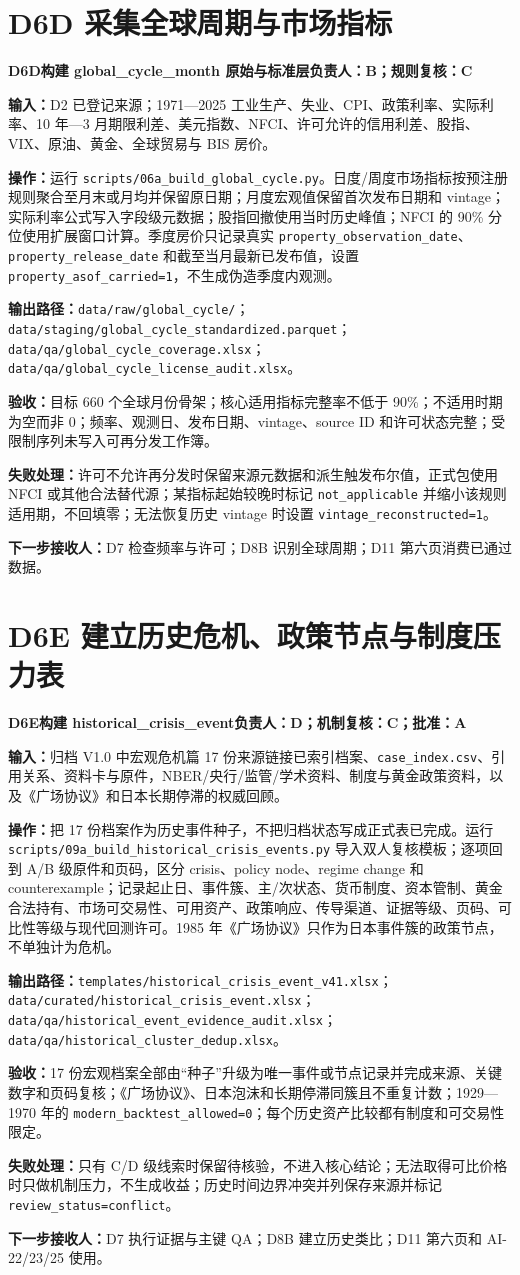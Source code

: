 \documentclass[UTF8,fontset=windows,12pt,openany]{ctexbook}
\newcommand{\Field}[1]{{\small\nolinkurl{#1}}}
\newcommand{\File}[1]{{\small\begingroup\urlstyle{same}\nolinkurl{#1}\endgroup}}
\newcommand{\StepTitle}[3]{%
  \noindent\colorbox{DeepNavy}{\parbox{0.965\textwidth}{\color{white}\Large\bfseries #1\quad #2\hfill\normalsize #3}}\par\medskip
}
\newcommand{\CardRow}[2]{\noindent\textbf{#1：}#2\par}
\begin{document}
\newpage
\section{D6D 采集全球周期与市场指标}
\StepTitle{D6D}{构建 global\_cycle\_month 原始与标准层}{负责人：B；规则复核：C}
\CardRow{输入}{D2 已登记来源；1971—2025 工业生产、失业、CPI、政策利率、实际利率、10 年—3 月期限利差、美元指数、NFCI、许可允许的信用利差、股指、VIX、原油、黄金、全球贸易与 BIS 房价。}
\CardRow{操作}{运行 \File{scripts/06a_build_global_cycle.py}。日度/周度市场指标按预注册规则聚合至月末或月均并保留原日期；月度宏观值保留首次发布日期和 vintage；实际利率公式写入字段级元数据；股指回撤使用当时历史峰值；NFCI 的 90\% 分位使用扩展窗口计算。季度房价只记录真实 \Field{property_observation_date}、\Field{property_release_date} 和截至当月最新已发布值，设置 \Field{property_asof_carried=1}，不生成伪造季度内观测。}
\CardRow{输出路径}{\File{data/raw/global_cycle/}；\File{data/staging/global_cycle_standardized.parquet}；\File{data/qa/global_cycle_coverage.xlsx}；\File{data/qa/global_cycle_license_audit.xlsx}。}
\CardRow{验收}{目标 660 个全球月份骨架；核心适用指标完整率不低于 90\%；不适用时期为空而非 0；频率、观测日、发布日期、vintage、source ID 和许可状态完整；受限制序列未写入可再分发工作簿。}
\CardRow{失败处理}{许可不允许再分发时保留来源元数据和派生触发布尔值，正式包使用 NFCI 或其他合法替代源；某指标起始较晚时标记 \Field{not_applicable} 并缩小该规则适用期，不回填零；无法恢复历史 vintage 时设置 \Field{vintage_reconstructed=1}。}
\CardRow{下一步接收人}{D7 检查频率与许可；D8B 识别全球周期；D11 第六页消费已通过数据。}

\section{D6E 建立历史危机、政策节点与制度压力表}
\StepTitle{D6E}{构建 historical\_crisis\_event}{负责人：D；机制复核：C；批准：A}
\CardRow{输入}{归档 V1.0 中宏观危机篇 17 份来源链接已索引档案、\File{case_index.csv}、引用关系、资料卡与原件，NBER/央行/监管/学术资料、制度与黄金政策资料，以及《广场协议》和日本长期停滞的权威回顾。}
\CardRow{操作}{把 17 份档案作为历史事件种子，不把归档状态写成正式表已完成。运行 \File{scripts/09a_build_historical_crisis_events.py} 导入双人复核模板；逐项回到 A/B 级原件和页码，区分 crisis、policy node、regime change 和 counterexample；记录起止日、事件簇、主/次状态、货币制度、资本管制、黄金合法持有、市场可交易性、可用资产、政策响应、传导渠道、证据等级、页码、可比性等级与现代回测许可。1985 年《广场协议》只作为日本事件簇的政策节点，不单独计为危机。}
\CardRow{输出路径}{\File{templates/historical_crisis_event_v41.xlsx}；\File{data/curated/historical_crisis_event.xlsx}；\File{data/qa/historical_event_evidence_audit.xlsx}；\File{data/qa/historical_cluster_dedup.xlsx}。}
\CardRow{验收}{17 份宏观档案全部由“种子”升级为唯一事件或节点记录并完成来源、关键数字和页码复核；《广场协议》、日本泡沫和长期停滞同簇且不重复计数；1929—1970 年的 \Field{modern_backtest_allowed=0}；每个历史资产比较都有制度和可交易性限定。}
\CardRow{失败处理}{只有 C/D 级线索时保留待核验，不进入核心结论；无法取得可比价格时只做机制压力，不生成收益；历史时间边界冲突并列保存来源并标记 \Field{review_status=conflict}。}
\CardRow{下一步接收人}{D7 执行证据与主键 QA；D8B 建立历史类比；D11 第六页和 AI-22/23/25 使用。}
\end{document}
